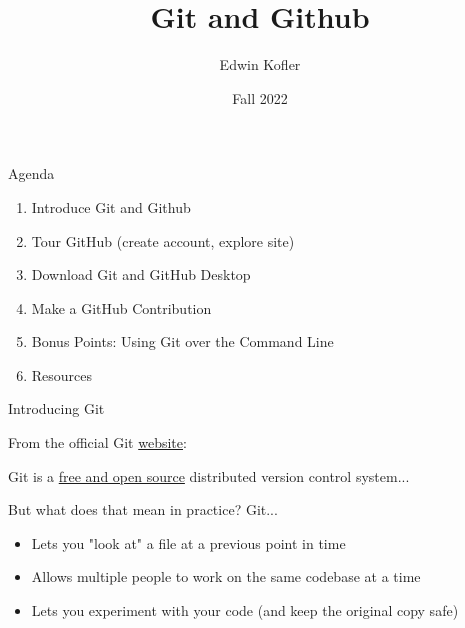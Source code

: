 \documentclass{beamer}
\title{Git and Github}
\author{Edwin Kofler}
\date{Fall 2022}
\begin{document}
\frame{\titlepage}


\begin{frame}{Agenda}
	\begin{enumerate}
		\item Introduce Git and Github
		\item Tour GitHub (create account, explore site)
		\item Download Git and GitHub Desktop
		\item Make a GitHub Contribution
		\item Bonus Points: Using Git over the Command Line
		\item Resources
	\end{enumerate}

\end{frame}


\begin{frame}{Introducing Git}

	From the official Git \href{https://git-scm.com}{website}: \newline

	\begin{displayquote}
		Git is a \href{https://git-scm.com/about/free-and-open-source}{free and open source} distributed version control system...
	\end{displayquote}

	But what does that mean in practice? Git...

	\begin{itemize}
		\item Lets you "look at" a file at a previous point in time
		\item Allows multiple people to work on the same codebase at a time
		\item Lets you experiment with your code (and keep the original copy safe)
	\end{itemize}

\end{frame}
\end{document}
